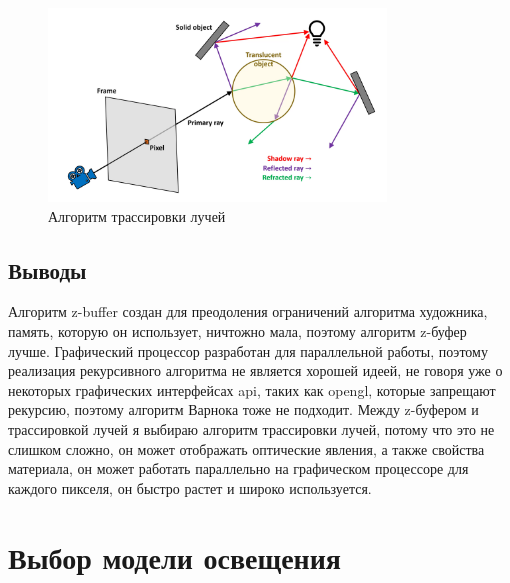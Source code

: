 \begin{figure}[ht]
  \centering
  \includegraphics[width=0.8\textwidth]{img/raytracing.png}
  \caption{Алгоритм трассировки лучей}
\end{figure}




\subsection*{Выводы}



Алгоритм z-buffer создан для преодоления ограничений алгоритма художника, память, которую он использует, ничтожно мала, поэтому алгоритм z-буфер лучше. Графический процессор разработан для параллельной работы, поэтому реализация рекурсивного алгоритма не является хорошей идеей, не говоря уже о некоторых графических интерфейсах api, таких как opengl, которые запрещают рекурсию, поэтому алгоритм Варнока тоже не подходит.
Между z-буфером и трассировкой лучей я выбираю алгоритм трассировки лучей, потому что это не слишком сложно, он может отображать оптические явления, а также свойства материала, он может работать параллельно на графическом процессоре для каждого пикселя, он быстро растет и широко используется.




\section{Выбор модели освещения}

